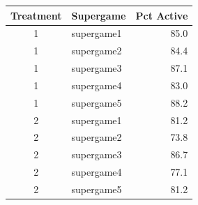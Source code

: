 \begin{tabular}{clr}
  \toprule
  Treatment & Supergame & Pct Active \\ 
  \midrule
  1 & supergame1 & 85.0 \\ 
  1 & supergame2 & 84.4 \\ 
  1 & supergame3 & 87.1 \\ 
  1 & supergame4 & 83.0 \\ 
  1 & supergame5 & 88.2 \\ 
  2 & supergame1 & 81.2 \\ 
  2 & supergame2 & 73.8 \\ 
  2 & supergame3 & 86.7 \\ 
  2 & supergame4 & 77.1 \\ 
  2 & supergame5 & 81.2 \\ 
  \bottomrule
\end{tabular}
